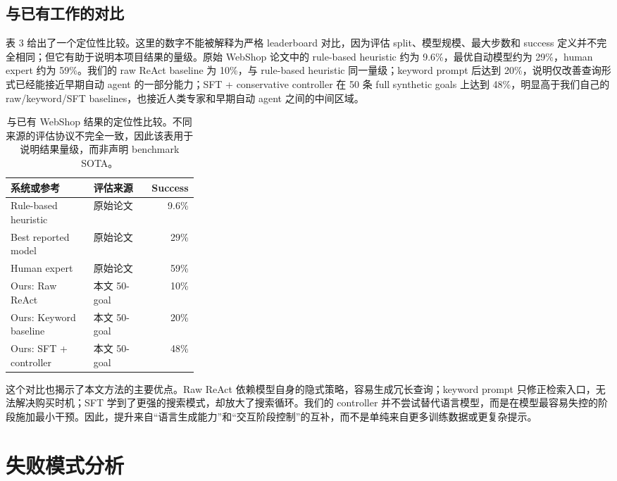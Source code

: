 \documentclass[11pt]{article}
\begin{document}
\subsection{与已有工作的对比}

表 3 给出了一个定位性比较。这里的数字不能被解释为严格 leaderboard 对比，因为评估 split、模型规模、最大步数和 success 定义并不完全相同；但它有助于说明本项目结果的量级。原始 WebShop 论文中的 rule-based heuristic 约为 9.6\%，最优自动模型约为 29\%，human expert 约为 59\%。我们的 raw ReAct baseline 为 10\%，与 rule-based heuristic 同一量级；keyword prompt 后达到 20\%，说明仅改善查询形式已经能接近早期自动 agent 的一部分能力；SFT + conservative controller 在 50 条 full synthetic goals 上达到 48\%，明显高于我们自己的 raw/keyword/SFT baselines，也接近人类专家和早期自动 agent 之间的中间区域。


\begin{table}[t]
\centering
\small
\renewcommand{\arraystretch}{1.08}
\begin{tabularx}{\linewidth}{@{}>{\raggedright\arraybackslash}X>{\raggedright\arraybackslash}p{0.31\linewidth}r@{}}
\toprule
系统或参考 & 评估来源 & Success \\
\midrule
Rule-based heuristic & 原始论文 & 9.6\% \\
Best reported model & 原始论文 & 29\% \\
Human expert & 原始论文 & 59\% \\
Ours: Raw ReAct & 本文 50-goal & 10\% \\
Ours: Keyword baseline & 本文 50-goal & 20\% \\
Ours: SFT + controller & 本文 50-goal & 48\% \\
\bottomrule
\end{tabularx}
\caption{与已有 WebShop 结果的定位性比较。不同来源的评估协议不完全一致，因此该表用于说明结果量级，而非声明 benchmark SOTA。}
\label{tab:comparison}
\end{table}


这个对比也揭示了本文方法的主要优点。Raw ReAct 依赖模型自身的隐式策略，容易生成冗长查询；keyword prompt 只修正检索入口，无法解决购买时机；SFT 学到了更强的搜索模式，却放大了搜索循环。我们的 controller 并不尝试替代语言模型，而是在模型最容易失控的阶段施加最小干预。因此，提升来自“语言生成能力”和“交互阶段控制”的互补，而不是单纯来自更多训练数据或更复杂提示。

\section{失败模式分析}
\end{document}
